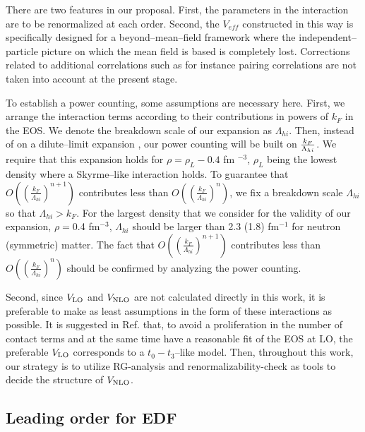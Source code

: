 \documentclass[aps,11pt,prc,preprint,superscriptaddress,nofootinbib]{revtex4}
\begin{document}
There are two features in our proposal. First, the parameters in
the interaction are to be renormalized at each order. Second, the $V_{eff}$
constructed in this way is specifically designed for a beyond--mean--field 
framework where the independent--particle picture on which the mean field is 
based is completely lost.
Corrections related to additional correlations such as for instance pairing correlations are 
not taken into account at the present stage. 

To establish a power counting, some assumptions are necessary here. First,
we arrange the interaction terms according to their contributions in powers of $%
k_F$ in the EOS. We denote the breakdown scale of our expansion as $\Lambda _{hi}$.   
 Then, instead of on a dilute--limit expansion 
 \cite{hammer,hammerlucas}, our power counting will be built on $\frac{k_F}{%
\Lambda _{hi}}$. We require that this expansion holds for $\rho =\rho_L- 0.4$ fm%
$^{-3}$, $\rho_L$ being the lowest density where a Skyrme--like interaction holds.  
{To guarantee that  $O\left( \left(\frac{k_F}{\Lambda _{hi}}\right)^{n+1}\right) $ contributes 
less than $O\left( \left(\frac{k_F}{\Lambda _{hi}}\right)^{n}\right) $, we fix a 
breakdown scale  $\Lambda _{hi}$ so that  $\Lambda _{hi}>k_F$. For the largest 
density that we consider for the validity of our expansion, 
$\rho=$0.4 fm$^{-3}$, $\Lambda _{hi}$ should be larger than 2.3 (1.8) fm$^{-1}$ for neutron 
(symmetric) matter. The fact that  $O\left( \left(\frac{k_F}{\Lambda _{hi}}\right)^{n+1}\right) $ 
contributes less than $O\left( \left(\frac{k_F}{\Lambda _{hi}}\right)^{n}\right) $ 
should be confirmed by analyzing the power counting. }  
 
Second, since $V_{\rm LO}$ and $V_{\rm NLO}$
are not calculated directly in this work, it is preferable to make as least
assumptions in the form of these interactions as possible. It is suggested in Ref.
  \cite{bira} that, to avoid a proliferation in the number of contact terms and at
the same time have a reasonable fit of the EOS at LO, the preferable $V_{\rm LO}$
corresponds to a $t_{0}-t_{3}$--like model. Then, throughout this work, our
strategy is to utilize RG-analysis and renormalizability-check as tools to
decide the structure of $V_{\rm NLO}$. 

\subsection{Leading order for EDF}
\end{document}
